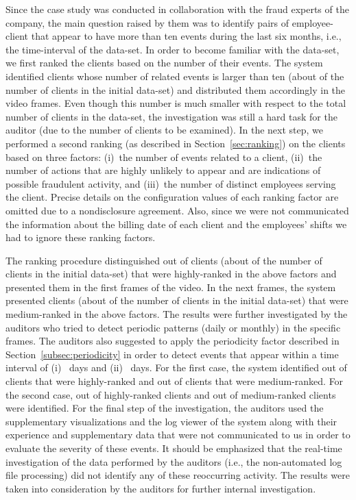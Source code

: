 \documentclass[conference]{IEEEtran}
\begin{document}
Since the case study was conducted in collaboration with the fraud
experts of the company, the main question raised by them was to
identify pairs of employee-client that appear to have more than ten
events during the last six months, i.e., the time-interval of the
data-set. In order to become familiar with the data-set, we first
ranked the clients based on the number of their events. The system
identified  clients whose number of related events is larger
than ten (about  of the number of clients in the initial
data-set) and distributed them accordingly in the video frames. Even
though this number is much smaller with respect to the total number
of clients in the data-set, the investigation was still a hard task
for the auditor (due to the number of clients to be examined). In
the next step, we performed a second ranking (as described in
Section~\ref{sec:ranking}) on the clients based on three factors:
(i)~the number of events related to a client, (ii)~the number of
actions that are highly unlikely to appear and are indications of
possible fraudulent activity, and (iii)~the number of distinct
employees serving the client. Precise details on the configuration
values of each ranking factor are omitted due to a nondisclosure
agreement. Also, since we were not communicated the information
about the billing date of each client and the employees' shifts we
had to ignore these ranking factors.

The ranking procedure distinguished  out of  clients (about
 of the number of clients in the initial data-set) that were
highly-ranked in the above factors and presented them in the first
frames of the video. In the next frames, the system presented 
clients (about  of the number of clients in the initial
data-set) that were medium-ranked in the above factors. The results
were further investigated by the auditors who tried to detect
periodic patterns (daily or monthly) in the specific frames. The
auditors also suggested to apply the periodicity factor described in
Section~\ref{subsec:periodicity} in order to detect events that
appear within a time interval of (i)~ days and (ii)~ days.
For the first case, the system identified  out of  clients
that were highly-ranked and  out of  clients that were
medium-ranked. For the second case,  out of  highly-ranked
clients and  out of  medium-ranked clients were identified.
For the final step of the investigation, the auditors used the
supplementary visualizations and the log viewer of the system along
with their experience and supplementary data that were not
communicated to us in order to evaluate the severity of these
events. It should be emphasized that the real-time investigation of
the data performed by the auditors (i.e., the non-automated log file
processing) did not identify any of these reoccurring activity. The
results were taken into consideration by the auditors for further
internal investigation.
\end{document}
